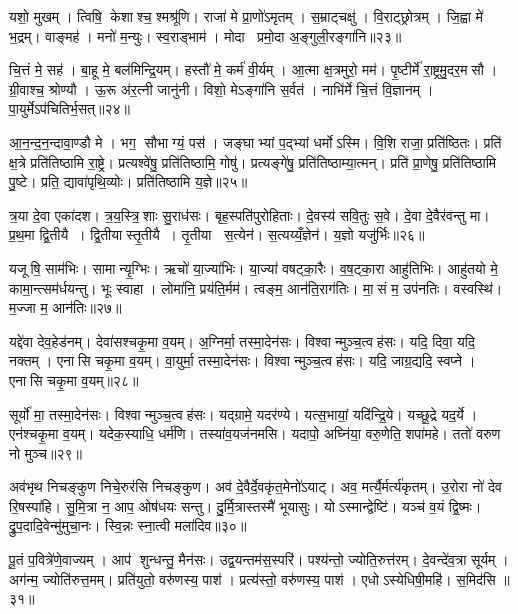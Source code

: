 यशो॒ मुखम्। त्विषि॒ केशाश्च॒ श्मश्रू॑णि। राजा॑ मे प्रा॒णो॑ऽमृतम्। स॒म्राट्चक्षु॑। वि॒राट्छ्रोत्रम्। जि॒ह्वा मे॑ भ॒द्रम्। वाङ्मह॑। मनो॑ म॒न्युः। स्व॒राड्भाम॑। मोदा प्रमो॒दा अ॒ङ्गुली॒रङ्गा॑नि॥२३॥

चि॒त्तं मे॒ सह॑। बा॒हू मे॒ बल॑मिन्द्रि॒यम्। हस्तौ॑ मे॒ कर्म॑ वी॒र्यम्। आ॒त्मा क्ष॒त्रमुरो॒ मम॑। पृ॒ष्टीर्मे॑ रा॒ष्ट्रमु॒दर॒मसौ। ग्री॒वाश्च॒ श्रोण्यौ। ऊ॒रू अ॑र॒त्नी जानु॑नी। विशो॒ मेऽङ्गा॑नि स॒र्वत॑। नाभि॑र्मे चि॒त्तं वि॒ज्ञानम्। पा॒युर्मेऽप॑चितिर्भ॒सत्॥२४॥

आ॒न॒न्द॒न॒न्दावा॒ण्डौ मे। भग॒ सौभाग्यं॒ पस॑। जङ्घाभ्यां प॒द्भ्यां धर्मोऽस्मि। वि॒शि राजा॒ प्रति॑ष्ठितः। प्रति॑ क्ष॒त्रे प्रति॑तिष्ठामि रा॒ष्ट्रे। प्रत्यश्वे॑षु॒ प्रति॑तिष्ठामि॒ गोषु॑। प्रत्यङ्गे॑षु॒ प्रति॑तिष्ठाम्या॒त्मन्। प्रति॑ प्रा॒णेषु॒ प्रति॑तिष्ठामि पु॒ष्टे। प्रति॒ द्यावा॑पृथि॒व्योः। प्रति॑तिष्ठामि य॒ज्ञे॥२५॥

त्र॒या दे॒वा एका॑दश। त्र॒य॒स्त्रि॒शाः सु॒राध॑सः। बृह॒स्पति॑पुरोहिताः। दे॒वस्य॑ सवि॒तुः स॒वे। दे॒वा दे॒वैर॑वन्तु मा। प्र॒थ॒मा द्वि॒तीयै। द्वि॒तीयास्तृ॒तीयै। तृ॒तीया स॒त्येन॑। स॒त्यय्यँ॒ज्ञेन॑। य॒ज्ञो यजु॑र्भिः॥२६॥

यजूषि॒ साम॑भिः। सामान्यृ॒ग्भिः। ऋचो॑ या॒ज्या॑भिः। या॒ज्या॑ वषट्का॒रैः। व॒ष॒ट्का॒रा आहु॑तिभिः। आहु॑तयो मे॒ कामा॒न्त्सम॑र्धयन्तु। भूः स्वाहा। लोमा॑नि॒ प्रय॑ति॒र्मम॑। त्वङ्म॒ आन॑ति॒राग॑तिः। मा॒सं म॒ उप॑नतिः। वस्वस्थि॑। म॒ज्जा म॒ आन॑तिः॥२७॥\anuvakamend[प॒स्त्यास्वा सर॑स्वत्यै॒ भैष॑ज्येन॒ श्रीरङ्गा॑नि भ॒सद्य॒ज्ञे य॒ज्ञो यजु॑र्भि॒रुप॑नति॒र्द्वे च॑]

यद्दे॑वा देव॒हेड॑नम्। देवा॑सश्चकृ॒मा व॒यम्। अ॒ग्निर्मा॒ तस्मा॒देन॑सः। विश्वान्मुञ्च॒त्वह॑सः। यदि॒ दिवा॒ यदि॒ नक्तम्। एनासि चकृ॒मा व॒यम्। वा॒युर्मा॒ तस्मा॒देन॑सः। विश्वान्मुञ्च॒त्वह॑सः। यदि॒ जाग्र॒द्यदि॒ स्वप्ने। एनासि चकृ॒मा व॒यम्॥२८॥

सूर्यो॑ मा॒ तस्मा॒देन॑सः। विश्वान्मुञ्च॒त्वह॑सः। यद्ग्रामे॒ यदर॑ण्ये। यत्स॒भायां॒ यदि॑न्द्रि॒ये। यच्छू॒द्रे यद॒र्ये। एन॑श्चकृ॒मा व॒यम्। यदेक॒स्याधि॒ धर्म॑णि। तस्या॑व॒यज॑नमसि। यदापो॒ अघ्नि॑या॒ वरु॒णेति॒ शपा॑महे। ततो॑ वरुण नो मुञ्च॥२९॥

अव॑भृथ निचङ्कुण निचे॒रुर॑सि निचङ्कुण। अव॑ दे॒वैर्दे॒वकृ॑त॒मेनो॑ऽयाट्। अव॒ मर्त्यै॒र्मर्त्य॑कृतम्। उ॒रोरा नो॑ देव रि॒षस्पा॑हि। सु॒मि॒त्रा न॒ आप॒ ओष॑धयः सन्तु। दु॒र्मि॒त्रास्तस्मै॑ भूयासुः। योऽस्मान्द्वेष्टि॑। यञ्च॑ व॒यं द्वि॒ष्मः। द्रु॒प॒दादि॒वेन्मु॑मुचा॒नः। स्वि॒न्नः स्ना॒त्वी मला॑दिव॥३०॥

पू॒तं प॒वित्रे॑णे॒वाज्यम्। आप॑ शुन्धन्तु॒ मैन॑सः। उद्व॒यन्तम॑स॒स्परि॑। पश्य॑न्तो॒ ज्योति॒रुत्त॑रम्। दे॒वन्दे॑व॒त्रा सूर्यम्। अग॑न्म॒ ज्योति॑रुत्त॒मम्। प्रति॑युतो॒ वरु॑णस्य॒ पाश॑। प्रत्य॑स्तो॒ वरु॑णस्य॒ पाश॑। एधोऽस्येधिषी॒महि॑। स॒मिद॑सि ॥३१॥

